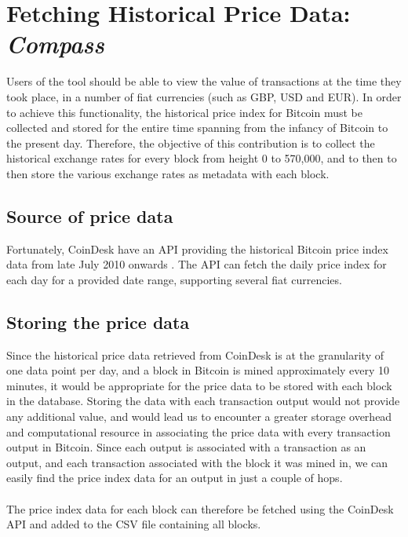 \chapter{Fetching Historical Price Data: \textit{Compass}}\label{section-price-data}
Users of the tool should be able to view the value of transactions at the time they took place, in a number of fiat currencies (such as GBP, USD and EUR). In order to achieve this functionality, the historical price index for Bitcoin must be collected and stored for the entire time spanning from the infancy of Bitcoin to the present day. Therefore, the objective of this contribution is to collect the historical exchange rates for every block from height 0 to 570,000, and to then to then store the various exchange rates as metadata with each block. 

\section{Source of price data}
Fortunately, CoinDesk have an API providing the historical Bitcoin price index data from late July 2010 onwards \cite{RefWorks:doc:5cacd8cbe4b092e311880f2b}. The API can fetch the daily price index for each day for a provided date range, supporting several fiat currencies.

\section{Storing the price data}
Since the historical price data retrieved from CoinDesk is at the granularity of one data point per day, and a block in Bitcoin is mined approximately every 10 minutes, it would be appropriate for the price data to be stored with each block in the database. Storing the data with each transaction output would not provide any additional value, and would lead us to encounter a greater storage overhead and computational resource in associating the price data with every transaction output in Bitcoin. Since each output is associated with a transaction as an output, and each transaction associated with the block it was mined in, we can easily find the price index data for an output in just a couple of hops. 
\\\\
The price index data for each block can therefore be fetched using the CoinDesk API and added to the CSV file containing all blocks.


